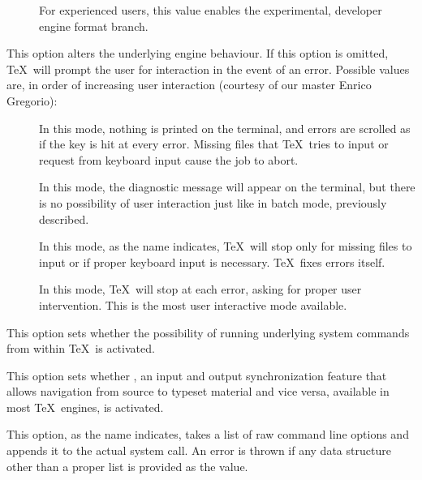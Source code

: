 \begin{description}
\begin{description}
\begin{description}
\item[] For experienced users, this value enables the experimental, developer engine format branch.
\end{description}

\item[\abox{interaction}] This option alters the underlying engine behaviour. If this option is omitted, \TeX\ will prompt the user for interaction in the event of an error. Possible values are, in order of increasing user interaction (courtesy of our master Enrico Gregorio):

\begin{description}
\item[] In this mode, nothing is printed on the terminal, and errors are scrolled as if the  key is hit at every error. Missing files that \TeX\ tries to input or request from keyboard input cause the job to abort.

\item[] In this mode, the diagnostic message will appear on the terminal, but there is no possibility of user interaction just like in batch mode, previously described.

\item[] In this mode, as the name indicates, \TeX\ will stop only for missing files to input or if proper keyboard input is necessary. \TeX\ fixes errors itself.

\item[] In this mode, \TeX\ will stop at each error, asking for proper user intervention. This is the most user interactive mode available.
\end{description}

\item[\rpsbox{shell}] This option sets whether the possibility of running underlying system commands from within \TeX\ is activated.

\item[\rpsbox{synctex}] This option sets whether , an input and output synchronization feature that allows navigation from source to typeset material and vice versa, available in most \TeX\ engines, is activated.

\item[\abox{options}] This option, as the name indicates, takes a list of raw command line options and appends it to the actual system call. An error is thrown if any data structure other than a proper list is provided as the value.
\end{description}


\end{description}
